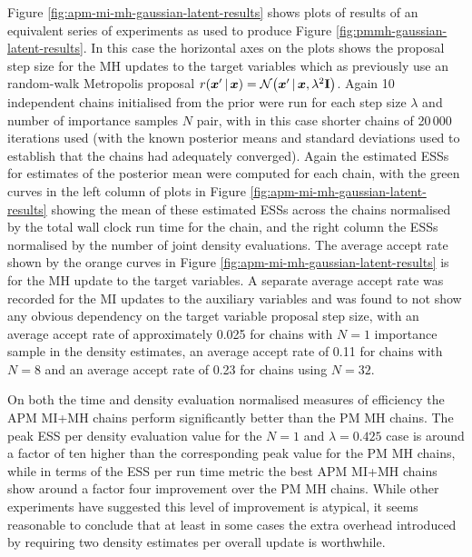 Figure \ref{fig:apm-mi-mh-gaussian-latent-results} shows plots of results of an equivalent series of experiments as used to produce Figure \ref{fig:pmmh-gaussian-latent-results}. In this case the horizontal axes on the plots shows the proposal step size for the \ac{MH} updates to the target variables which as previously use an random-walk Metropolis proposal $r(\vct{x}'\gvn\vct{x}) = \nrm{\vct{x}'\gvn\vct{x},\lambda^2\mathbf{I}}$. Again 10 independent chains initialised from the prior were run for each step size $\lambda$ and number of importance samples $N$ pair, with in this case shorter chains of 20\,000 iterations used (with the known posterior means and standard deviations used to establish that the chains had adequately converged). Again the estimated \acp{ESS} for estimates of the posterior mean were computed for each chain, with the green curves in the left column of plots in Figure \ref{fig:apm-mi-mh-gaussian-latent-results} showing the mean of these estimated \acp{ESS} across the chains normalised by the total wall clock run time for the chain, and the right column the \acp{ESS} normalised by the number of joint density evaluations. The average accept rate shown by the orange curves in Figure \ref{fig:apm-mi-mh-gaussian-latent-results} is for the \ac{MH} update to the target variables. A separate average accept rate was recorded for the \ac{MI} updates to the auxiliary variables and was found to not show any obvious dependency on the target variable proposal step size, with an average accept rate of approximately 0.025 for chains with $N=1$ importance sample in the density estimates, an average accept rate of 0.11 for chains with $N=8$ and an average accept rate of 0.23 for chains using $N=32$. %

On both the time and density evaluation normalised measures of efficiency the \ac{APM} \ac{MI}+\ac{MH} chains perform significantly better than the \ac{PM} \ac{MH} chains. The peak \ac{ESS} per density evaluation value for the $N=1$ and $\lambda=0.425$ case is around a factor of ten higher than the corresponding peak value for the \ac{PM} \ac{MH} chains, while in terms of the \ac{ESS} per run time metric the best \ac{APM} \ac{MI}+\ac{MH} chains show around a factor four improvement over the \ac{PM} \ac{MH} chains. While other experiments have suggested this level of improvement is atypical, it seems reasonable to conclude that at least in some cases the extra overhead introduced by requiring two density estimates per overall update is worthwhile.

